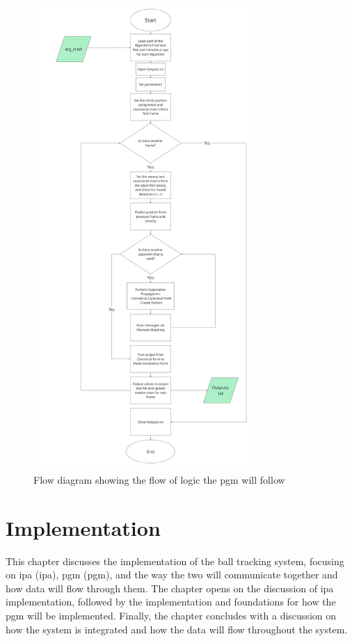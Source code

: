\documentclass[12pt,a4paper]{article}
\begin{document}
\begin{figure}[H]
	\centering
	\includegraphics[width=0.75\textwidth]{pgmflowdesign.jpg}
	\caption{Flow diagram showing the flow of logic the \acs{pgm} will follow}
	\label{fig:pgmflow}
\end{figure}

 \newpage
\section{Implementation}
This chapter discusses the implementation of the ball tracking system, focusing on \acs{ipa} (\acl{ipa}), \acs{pgm} (\acl{pgm}), and the way the two will communicate together and how data will flow through them. The chapter opens on the discussion of \acs{ipa} implementation, followed by the implementation and foundations for how the \acs{pgm} will be implemented. Finally, the chapter concludes with a discussion on how the system is integrated and how the data will flow throughout the system.
\end{document}
